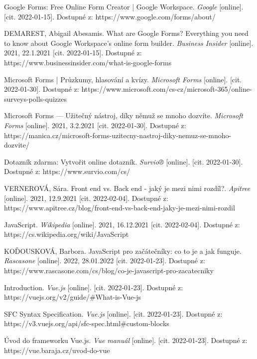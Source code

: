 \begin{thebibliography}{32}
Google Forms: Free Online Form Creator | Google Workspace. \textit{Google} [online]. [cit. 2022-01-15]. Dostupné z: https://www.google.com/forms/about/

DEMAREST, Abigail Abesamis. What are Google Forms? Everything you need to know about Google Workspace's online form builder. \textit{Business Insider} [online]. 2021, 22.1.2021 [cit. 2022-01-15]. Dostupné z: https://www.businessinsider.com/what-is-google-forms

Microsoft Forms | Průzkumy, hlasování a kvízy. \textit{Microsoft Forms} [online]. [cit. 2022-01-30]. Dostupné z: https://www.microsoft.com/cs-cz/microsoft-365/online-surveys-polls-quizzes

Microsoft Forms --- Užitečný nástroj, díky němuž se mnoho dozvíte. \textit{Microsoft Forms} [online]. 2021, 3.2.2021 [cit. 2022-01-30]. Dostupné z: https://manica.cz/microsoft-forms-uzitecny-nastroj-diky-nemuz-se-mnoho-dozvite/

Dotazník zdarma: Vytvořit online dotazník. \textit{Survio®} [online]. [cit. 2022-01-30]. Dostupné z: https://www.survio.com/cs/

VERNEROVÁ, Sára. Front end vs. Back end - jaký je mezi nimi rozdíl?. \textit{Apitree} [online]. 2021, 12.9.2021 [cit. 2022-02-04]. Dostupné z: https://www.apitree.cz/blog/front-end-vs-back-end-jaky-je-mezi-nimi-rozdil

JavaScript. \textit{Wikipedia} [online]. 2021, 16.12.2021 [cit. 2022-02-04]. Dostupné z: https://cs.wikipedia.org/wiki/JavaScript

KOĎOUSKOVÁ, Barbora. JavaScript pro začátečníky: co to je a jak funguje. \textit{Rascasone} [online]. 2022, 28.01.2022 [cit. 2022-01-23]. Dostupné z: https://www.rascasone.com/cs/blog/co-je-javascript-pro-zacatecniky

Introduction. \textit{Vue.js} [online]. [cit. 2022-01-23]. Dostupné z: https://vuejs.org/v2/guide/\#What-is-Vue-js

SFC Syntax Specification. \textit{Vue.js} [online]. [cit. 2022-01-23]. Dostupné z: https://v3.vuejs.org/api/sfc-spec.html\#custom-blocks

Úvod do frameworku Vue.js. \textit{Vue manuál} [online]. [cit. 2022-01-23]. Dostupné z: https://vue.baraja.cz/uvod-do-vue


\end{thebibliography}
